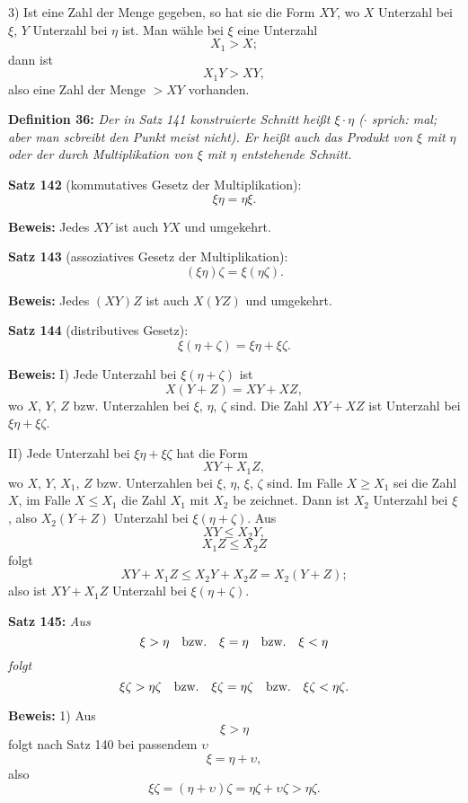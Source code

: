 3) Ist eine Zahl der Menge gegeben, so hat sie die Form $XY$,
wo $X$ Unterzahl bei $\xi$, $Y$ Unterzahl bei $\eta$ ist.  Man w\"ahle bei $\xi$
eine Unterzahl
$$X_1 > X;$$
dann ist
$$X_1 Y > XY,$$
also eine Zahl der Menge $> XY$ vorhanden.
\medskip

{\bf Definition 36:} {\it Der in Satz 141 konstruierte Schnitt hei{\ss}t $\xi \cdot \eta$
{\rm ($\cdot$ sprich: mal; aber man scbreibt den Punkt meist nicht).}  Er hei{\ss}t
auch das Produkt von $\xi$ mit $\eta$ oder der durch Multiplikation von $\xi$
mit $\eta$ entstehende Schnitt.}
\medskip


{\bf Satz 142} (kommutatives Gesetz der Multiplikation):
{\it $$\xi\eta = \eta\xi.$$}%

{\bf Beweis:} Jedes $XY$ ist auch $YX$ und umgekehrt.
\medskip


{\bf Satz 143} (assoziatives Gesetz der Multiplikation):
{\it $$(\xi\eta)\zeta = \xi(\eta\zeta).$$}%

{\bf Beweis:} Jedes $(XY)Z$ ist auch $X(YZ)$ und umgekehrt.
\medskip


{\bf Satz 144} (distributives Gesetz):
{\it $$\xi(\eta + \zeta) = \xi\eta + \xi\zeta.$$}%

{\bf Beweis:} I) Jede Unterzahl bei $\xi(\eta + \zeta)$ ist
$$X(Y + Z) = XY + XZ,$$
wo $X$, $Y$, $Z$ bzw. Unterzahlen bei $\xi$, $\eta$, $\zeta$ sind.  Die Zahl $XY + XZ$
ist Unterzahl bei $\xi\eta + \xi\zeta$.

II) Jede Unterzahl bei $\xi\eta + \xi\zeta$ hat die Form
$$XY + X_1 Z,$$
wo $X$, $Y$, $X_1$, $Z$ bzw. Unterzahlen bei $\xi$, $\eta$, $\xi$, $\zeta$ sind.  Im Falle
$X \ge X_1$ sei die Zahl $X$, im Falle $X \le X_1$ die Zahl $X_1$ mit $X_2$ be%
zeichnet.  Dann ist $X_2$ Unterzahl bei $\xi$, also $X_2 (Y + Z)$ Unterzahl
bei $\xi(\eta + \zeta)$.  Aus
$$XY \le X_2 Y,$$
$$X_1 Z \le X_2 Z$$
folgt
$$XY + X_1 Z \le X_2 Y + X_2 Z = X_2 (Y + Z);$$
also ist $XY + X_1 Z$ Unterzahl bei $\xi(\eta + \zeta)$.
\medskip


{\bf Satz 145:} {\it Aus
$$\xi > \eta\quad\hbox{bzw.}\quad \xi = \eta\quad\hbox{bzw.}\quad \xi < \eta$$
folgt
$$\xi\zeta > \eta\zeta\quad\hbox{bzw.}\quad \xi\zeta = \eta\zeta\quad\hbox{bzw.}\quad \xi\zeta < \eta\zeta.$$}%

{\bf Beweis:} 1) Aus
$$\xi > \eta$$
folgt nach Satz 140 bei passendem $\upsilon$
$$\xi = \eta + \upsilon,$$
also
$$\xi\zeta = (\eta + \upsilon)\zeta = \eta\zeta + \upsilon\zeta > \eta\zeta.$$

